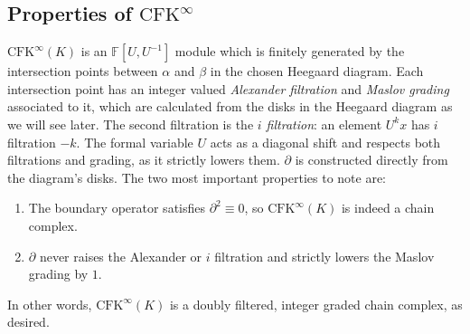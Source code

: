 \documentclass[reqno, 12pt]{amsart}
\theoremstyle{remark}
\begin{document}
\subsection{Properties of $\text{CFK}^{\infty}$}
	$\text{CFK}^{\infty}(K)$ is an $\mathbb{F}[U, U^{-1}]$ module which is finitely generated by the intersection points between $\alpha$ and $\beta$ in the chosen Heegaard diagram. Each intersection point has an integer valued \textit{Alexander filtration} and \textit{Maslov grading} associated to it, which are calculated from the disks in the Heegaard diagram as we will see later. The second filtration is the \textit{$i$ filtration}: an element $U^kx$ has $i$ filtration $-k$. The formal variable $U$ acts as a diagonal shift and respects both filtrations and grading, as it strictly lowers them. $\partial$ is constructed directly from the diagram's disks. The two most important properties to note are:
\begin{enumerate}[nosep]
	\item{The boundary operator satisfies $\partial^2 \equiv 0$,  so $\text{CFK}^{\infty}(K)$ is indeed a chain complex.}
	\item{$\partial$ never raises the Alexander or $i$ filtration and strictly lowers the Maslov grading by $1$.}
\end{enumerate}
In other words, $\text{CFK}^{\infty}(K)$ is a doubly filtered, integer graded chain complex, as desired.
\end{document}
